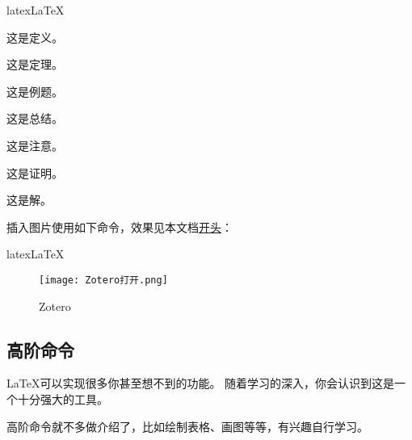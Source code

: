 \begin{envcode}[listing side text, lefthand ratio=0.48]{latex}{LaTeX}
\begin{dy}
    这是定义。
\end{dy}

\begin{dl}
    这是定理。
\end{dl}

\begin{lt}
    这是例题。
\end{lt}

\begin{zj}
    这是总结。
\end{zj}

\begin{zy}
    这是注意。
\end{zy}

\begin{zm}
    这是证明。
\end{zm}

\begin{jie}
    这是解。
\end{jie}
\end{envcode}


插入图片使用如下命令，效果见本文档\hyperref[Zotero 1]{开头}：
\begin{envcode}{latex}{LaTeX}
\begin{figure}[htbp]
    \centering
    \texttt{[image: Zotero打开.png]}
    \caption{Zotero}
    \label{Zotero 1}
\end{figure}
\end{envcode}

\newpage

\subsection{高阶命令}

\LaTeX{}可以实现很多你甚至想不到的功能。
随着学习的深入，你会认识到这是一个十分强大的工具。

高阶命令就不多做介绍了，比如绘制表格、画图等等，有兴趣自行学习。

